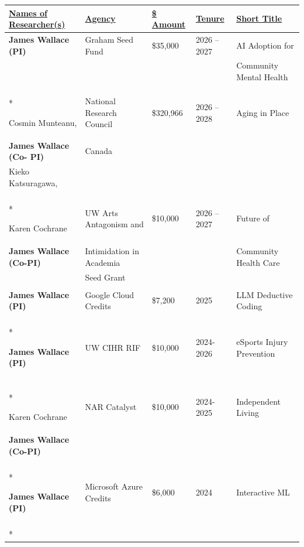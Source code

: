 \documentclass[12pt]{article}
\begin{document}
\begin{longtable}[c]{p{4.5cm} l l l p{4.5cm}}
\underline{Names of Researcher(s)}  &	\underline{Agency}		& \underline{\$ Amount}   &	\underline{Tenure}    &	\underline{Short Title} \\
\endhead

\textbf{James Wallace (PI)}       & Graham Seed Fund   & \$35,000   & 2026 -- 2027 & AI Adoption for \\
& & & & Community Mental Health \\
\\*

Cosmin Munteanu, &   National Research Council & \$320,966 & 2026 -- 2028 & Aging in Place \\
\textbf{James Wallace (Co- PI)}  & Canada \\ 
Kieko Katsuragawa, \\
\\*

Karen Cochrane & UW Arts Antagonism and & \$10,000 & 2026 -- 2027 & Future of  \\
\textbf{James Wallace (Co-PI)} & Intimidation in Academia & & & Community Health Care \\
& Seed Grant \\
\\



\textbf{James Wallace (PI)}       & Google Cloud Credits   & \$7,200   & 2025 & LLM Deductive Coding \\
\\*


\textbf{James Wallace (PI)} & UW CIHR RIF & \$10,000 & 2024-2026 & eSports Injury Prevention \\
\\*

Karen Cochrane      & NAR Catalyst              & \$10,000  & 2024-2025 & Independent Living \\
\textbf{James Wallace (Co-PI)} \\
\\*

\textbf{James Wallace (PI)}       & Microsoft Azure Credits   & \$6,000   & 2024 & Interactive ML \\
\\*


\end{longtable}
\end{document}

